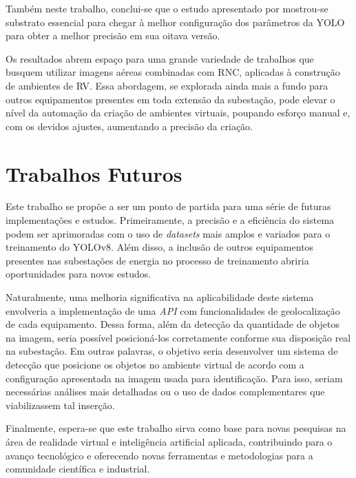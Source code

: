 Também neste trabalho, conclui-se que o estudo apresentado por  mostrou-se substrato essencial para chegar à melhor configuração dos parâmetros da YOLO para obter a melhor precisão em sua oitava versão.

Os resultados abrem espaço para uma grande variedade de trabalhos que busquem utilizar imagens aéreas combinadas com RNC, aplicadas à construção de ambientes de RV. Essa abordagem, se explorada ainda mais a fundo para outros equipamentos presentes em toda extensão da subestação, pode elevar o nível da automação da criação de ambientes virtuais, poupando esforço manual e, com os devidos ajustes, aumentando a precisão da criação.

\section{Trabalhos Futuros} 

Este trabalho se propõe a ser um ponto de partida para uma série de futuras implementações e estudos. Primeiramente, a precisão e a eficiência do sistema podem ser aprimoradas com o uso de \textit{datasets} mais amplos e variados para o treinamento do YOLOv8. Além disso, a inclusão de outros equipamentos presentes nas subestações de energia no processo de treinamento abriria oportunidades para novos estudos.

Naturalmente, uma melhoria significativa na aplicabilidade deste sistema envolveria a implementação de uma \textit{API} com funcionalidades de geolocalização de cada equipamento. Dessa forma, além da detecção da quantidade de objetos na imagem, seria possível posicioná-los corretamente conforme sua disposição real na subestação. Em outras palavras, o objetivo seria desenvolver um sistema de detecção que posicione os objetos no ambiente virtual de acordo com a configuração apresentada na imagem usada para identificação. Para isso, seriam necessárias análises mais detalhadas ou o uso de dados complementares que viabilizassem tal inserção.

Finalmente, espera-se que este trabalho sirva como base para novas pesquisas na área de realidade virtual e inteligência artificial aplicada, contribuindo para o avanço tecnológico e oferecendo novas ferramentas e metodologias para a comunidade científica e industrial.



